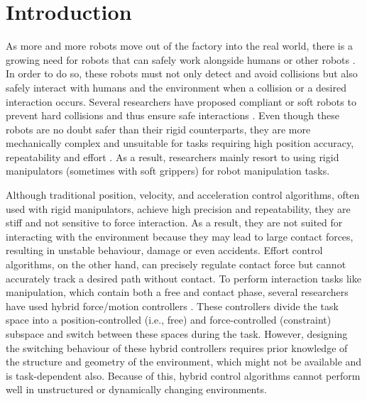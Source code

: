 \chapter{Introduction}
\label{chapter:introduction}

As more and more robots move out of the factory into the real world, there is a growing need for robots that can safely work alongside humans or other robots \cite{sharkawySurveyApplicationsHumanRobot2021,zacharakiSafetyBoundsHuman2020,suomalainenSurveyRobotManipulation2021}. In order to do so, these robots must not only detect and avoid collisions \cite{haddadinRobotCollisionsSurvey2017, zacharakiSafetyBoundsHuman2020} but also safely interact with humans and the environment when a collision or a desired interaction occurs. Several researchers have proposed compliant or soft robots to prevent hard collisions and thus ensure safe interactions \cite{hughesSoftManipulatorsGrippers2016,douSoftRoboticManipulators2021}. Even though these robots are no doubt safer than their rigid counterparts, they are more mechanically complex and unsuitable for tasks requiring high position accuracy, repeatability and effort \cite{douSoftRoboticManipulators2021}. As a result, researchers mainly resort to using rigid manipulators (sometimes with soft grippers) for robot manipulation tasks.

Although traditional position, velocity, and acceleration control algorithms, often used with rigid manipulators, achieve high precision and repeatability, they are stiff and not sensitive to force interaction. As a result, they are not suited for interacting with the environment because they may lead to large contact forces, resulting in unstable behaviour, damage or even accidents. Effort control algorithms, on the other hand, can precisely regulate contact force but cannot accurately track a desired path without contact. To perform interaction tasks like manipulation, which contain both a free and contact phase, several researchers have used hybrid force/motion controllers \cite{raibertHybridPositionForce1981,ortenziHybridMotionForce2017}. These controllers divide the task space into a position-controlled (i.e., free) and force-controlled (constraint) subspace and switch between these spaces during the task. However, designing the switching behaviour of these hybrid controllers requires prior knowledge of the structure and geometry of the environment, which might not be available and is task-dependent also. Because of this, hybrid control algorithms cannot perform well in unstructured or dynamically changing environments.

